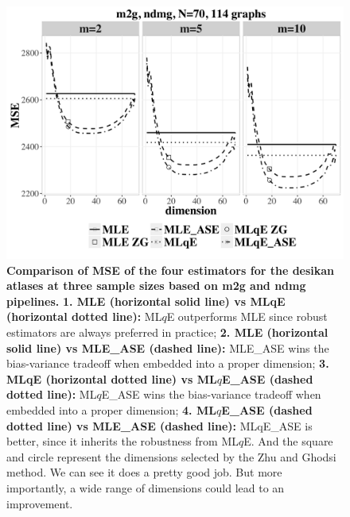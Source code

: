 \documentclass[simplex.tex]{subfiles}
\begin{document}
\begin{figure}[h!]
\begin{cframed}
\centering
\includegraphics[width=\textwidth]{../../figs/CCI_m2g_ndmg_Weighted_q_0.9_EIG.png}
\caption{
{\bf Comparison of MSE of the four estimators for the desikan atlases at three sample sizes based on m2g and ndmg pipelines.}  
{\bf 1. MLE (horizontal solid line) vs MLqE (horizontal dotted line):} 
ML$q$E outperforms MLE since robust estimators are always preferred in practice;
{\bf 2. MLE (horizontal solid line) vs MLE\_ASE (dashed line):} MLE\_ASE wins the bias-variance tradeoff when embedded into a proper dimension; 
{\bf 3. MLqE (horizontal dotted line) vs ML$q$E\_ASE (dashed dotted line):}
ML$q$E\_ASE wins the bias-variance tradeoff when embedded into a proper dimension; 
{\bf 4.  ML$q$E\_ASE (dashed dotted line) vs MLE\_ASE (dashed
line):}
MLqE\_ASE is better, since it inherits the robustness from 
ML$q$E. And the square and circle represent the dimensions selected by the Zhu and Ghodsi method. We can see it does a pretty good job. But more importantly, a wide range of dimensions could lead to an improvement.
}
\label{fig:robDim}
\end{cframed}
\end{figure}
\end{document}
